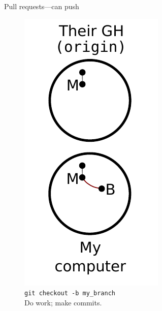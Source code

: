 \begin{frame}{Pull requests---can push}
  \begin{figure}
    \includegraphics{push_003.pdf}
    \\ \texttt{git checkout -b my\_branch}
    \\ Do work; make commits.
  \end{figure}
\end{frame}

